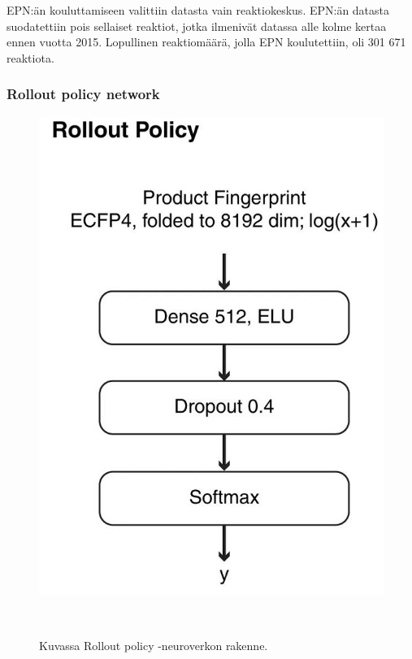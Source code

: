 \documentclass[finnish,twoside,censored,tkt,sw-line]{HYthesisML}
\begin{document}
EPN:än kouluttamiseen valittiin datasta vain reaktiokeskus.
EPN:än datasta suodatettiin pois sellaiset reaktiot, jotka ilmenivät datassa alle kolme kertaa ennen vuotta 2015.
Lopullinen reaktiomäärä, jolla EPN koulutettiin, oli 301 671 reaktiota.

\subsubsection{Rollout policy network}

\begin{figure}
    \centering
    \includegraphics[]{rollout-policy.jpg}
    \caption{Kuvassa Rollout policy -neuroverkon rakenne.}
    {~\cite{SeglerMarwinHS2018Pcsw}}
\end{figure}

\end{document}
